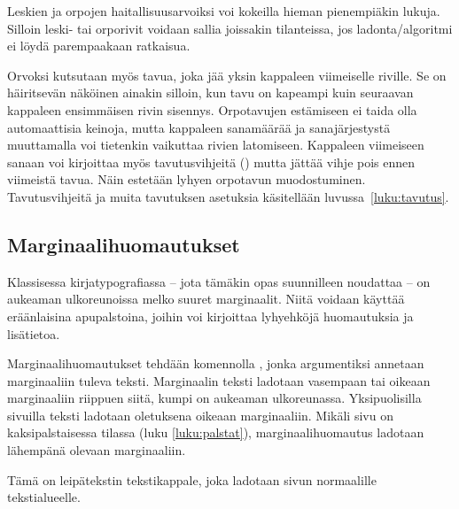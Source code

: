 \begin{koodilohkosis}
\end{koodilohkosis}

Leskien ja orpojen haitallisuusarvoiksi voi kokeilla hieman pienempiäkin
lukuja. Silloin leski- tai orporivit voidaan sallia joissakin
tilanteissa, jos ladonta\-/algoritmi ei löydä parempaakaan ratkaisua.

Orvoksi kutsutaan myös tavua, joka jää yksin kappaleen viimeiselle
riville. Se on häiritsevän näköinen ainakin silloin, kun tavu on
kapeampi kuin seuraavan kappaleen ensimmäisen rivin sisennys.
Orpotavujen estämiseen ei taida olla automaattisia keinoja, mutta
kappaleen sanamäärää ja sanajärjestystä muuttamalla voi tietenkin
vaikuttaa rivien latomiseen. Kappaleen viimeiseen sanaan voi kirjoittaa
myös tavutusvihjeitä (\komento{-}) mutta jättää vihje pois ennen
viimeistä tavua. Näin estetään lyhyen orpotavun muodostuminen.
Tavutusvihjeitä ja muita tavutuksen asetuksia käsitellään
luvussa~\ref{luku:tavutus}.

\subsection{Marginaalihuomautukset}
\label{luku:marginaalihuomautukset}

Klassisessa kirjatypografiassa -- jota tämäkin opas suunnilleen
noudattaa -- on aukeaman ulkoreunoissa melko suuret marginaalit. Niitä
voidaan käyttää eräänlaisina apupalstoina, joihin voi kirjoittaa
lyhyehköjä huomautuksia ja lisätietoa.

Marginaalihuomautukset tehdään komennolla , jonka
argumentiksi annetaan marginaaliin tuleva teksti. Marginaalin teksti
ladotaan vasempaan tai oikeaan marginaaliin riippuen siitä, kumpi on
aukeaman ulkoreunassa. Yksipuolisilla sivuilla teksti ladotaan
oletuksena oikeaan marginaaliin. Mikäli sivu on kaksipalstaisessa
tilassa (luku \ref{luku:palstat}), marginaalihuomautus ladotaan
lähempänä olevaan marginaaliin.

\begin{koodilohkosis}
Tämä on leipätekstin tekstikappale,
joka ladotaan sivun normaalille tekstialueelle.
\end{koodilohkosis}


